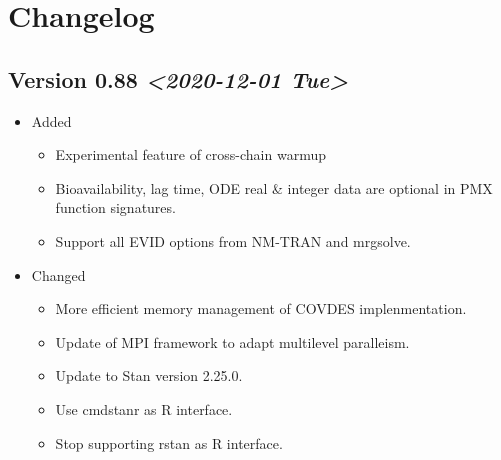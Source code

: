 \documentclass[11pt, reqno, oneside]{amsbook}
\numberwithin{equation}{chapter}
\numberwithin{figure}{chapter}
\numberwithin{table}{chapter}
\theoremstyle{remark}
\begin{document}
\section*{Changelog}
\label{changelog}
\subsection*{Version 0.88 \textit{<2020-12-01 Tue>}}
\label{sec:org810e7af}
\begin{itemize}
\item Added
\label{0-85-added}
\begin{itemize}
\item Experimental feature of cross-chain warmup
\item Bioavailability, lag time, ODE real \& integer data are optional in PMX function signatures.
\item Support all EVID options from NM-TRAN and mrgsolve.
\end{itemize}
\item Changed
\label{0-85-changed}
\begin{itemize}
\item More efficient memory management of COVDES implenmentation.
\item Update of MPI framework to adapt multilevel paralleism.
\item Update to Stan version 2.25.0.
\item Use cmdstanr as R interface.
\item Stop supporting rstan as R interface.
\end{itemize}
\end{itemize}
\end{document}

